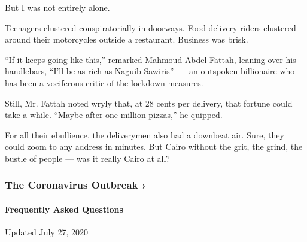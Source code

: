 But I was not entirely alone.

Teenagers clustered conspiratorially in doorways. Food-delivery riders
clustered around their motorcycles outside a restaurant. Business was
brisk.

``If it keeps going like this,'' remarked Mahmoud Abdel Fattah, leaning
over his handlebars, ``I'll be as rich as Naguib Sawiris'' ---~an
outspoken billionaire who has been a vociferous critic of the lockdown
measures.

Still, Mr. Fattah noted wryly that, at 28 cents per delivery, that
fortune could take a while. ``Maybe after one million pizzas,'' he
quipped.

For all their ebullience, the deliverymen also had a downbeat air. Sure,
they could zoom to any address in minutes. But Cairo without the grit,
the grind, the bustle of people --- was it really Cairo at all?

\href{https://www.nytimes3xbfgragh.onion/news-event/coronavirus?action=click\&pgtype=Article\&state=default\&region=MAIN_CONTENT_3\&context=storylines_faq}{}

\hypertarget{the-coronavirus-outbreak-}{%
\subsubsection{The Coronavirus Outbreak
›}\label{the-coronavirus-outbreak-}}

\hypertarget{frequently-asked-questions}{%
\paragraph{Frequently Asked
Questions}\label{frequently-asked-questions}}

Updated July 27, 2020

